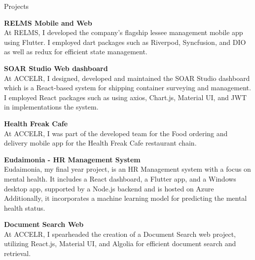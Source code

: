 \documentclass[
	11pt, %
]{./../assets/resume} %
\begin{document}

\begin{rSection}{Projects}

	\textbf{RELMS Mobile and Web} \\
	At RELMS, I developed the company's flagship lessee management mobile app using Flutter. I employed dart packages such as Riverpod, Syncfusion, and DIO as well as redux for efficient state management.

	\textbf{SOAR Studio Web dashboard} \\
	At ACCELR, I designed, developed and maintained the SOAR Studio dashboard which is a React-based system for shipping container surveying and management.  I employed React packages such as using axios, Chart.js, Material UI, and JWT in implementations the system.

	\textbf{Health Freak Cafe} \\
	At ACCELR, I was part of the developed team for the Food ordering and delivery mobile app for the Health Freak Cafe restaurant chain.

	\textbf{Eudaimonia - HR Management System} \\
	Eudaimonia, my final year project, is an HR Management system with a focus on mental health. It includes a React dashboard, a Flutter app, and a Windows desktop app, supported by a Node.js backend and is hosted on Azure Additionally, it incorporates a machine learning model for predicting the mental health status.

	\textbf{Document Search Web} \\
	At ACCELR, I spearheaded the creation of a Document Search web project, utilizing React.js, Material UI, and Algolia for efficient document search and retrieval.

\end{rSection}




\end{document}
